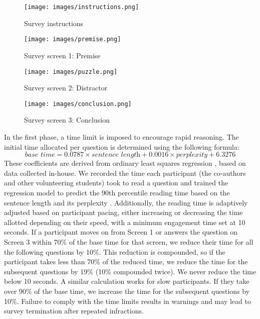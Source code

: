         \begin{figure}[t]
            \centering
            \begin{minipage}{0.49\textwidth}
                \centering
                \texttt{[image: images/instructions.png]}
                \caption{Survey instructions}
                \label{fig:instructions}
            \end{minipage}
            \hfill
            \begin{minipage}{0.49\textwidth}
                \centering
                \texttt{[image: images/premise.png]}
                \caption{Survey screen 1: Premise}
                \label{fig:premise}
                \texttt{[image: images/puzzle.png]}
                \caption{Survey screen 2: Distractor}
                \label{fig:distractor}
                \texttt{[image: images/conclusion.png]}
                \caption{Survey screen 3: Conclusion}
                \label{fig:conclusion}
            \end{minipage}
           \label{fig:puzzle-distraction}
        \end{figure}

        In the first phase, a time limit is imposed to encourage rapid reasoning. The initial time allocated per question is determined using the following formula:
        \[ \textit{base time} = 0.0787 \times \textit{sentence length} + 0.0016 \times \textit{perplexity} + 6.3276 \]
        These coefficients are derived from ordinary least squares regression \citep{michalos_ordinary_2014}, based on data collected in-house. We recorded the time each participant (the co-authors and other volunteering students) took to read a question and trained the regression model to predict the 90th percentile reading time based on the sentence length and its perplexity \citep{jelinek_perplexitymeasure_1977}. Additionally, the reading time is adaptively adjusted based on participant pacing, either increasing or decreasing the time allotted depending on their speed, with a minimum engagement time set at 10 seconds. If a participant moves on from Screen 1 or answers the question on Screen 3 within 70\% of the base time for that screen, we reduce their time for all the following questions by 10\%. This reduction is compounded, so if the participant takes less than 70\% of the reduced time, we reduce the time for the subsequent questions by 19\% (10\% compounded twice). We never reduce the time below 10 seconds. A similar calculation works for slow participants. If they take over 90\% of the base time, we increase the time for the subsequent questions by 10\%. Failure to comply with the time limits results in warnings and may lead to survey termination after repeated infractions.
        
